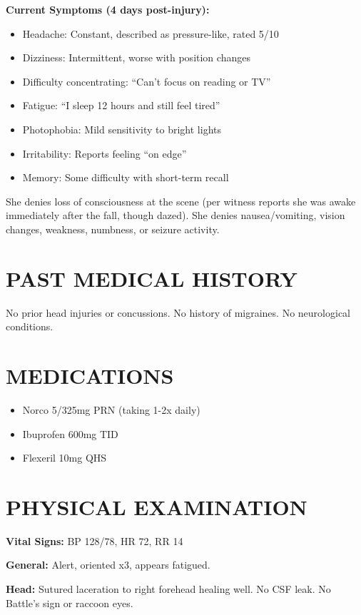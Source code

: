 \documentclass[11pt]{article}
\begin{document}
\textbf{Current Symptoms (4 days post-injury):}
\begin{itemize}[nosep]
\item Headache: Constant, described as pressure-like, rated 5/10
\item Dizziness: Intermittent, worse with position changes
\item Difficulty concentrating: ``Can't focus on reading or TV''
\item Fatigue: ``I sleep 12 hours and still feel tired''
\item Photophobia: Mild sensitivity to bright lights
\item Irritability: Reports feeling ``on edge''
\item Memory: Some difficulty with short-term recall
\end{itemize}

She denies loss of consciousness at the scene (per witness reports she was awake immediately after the fall, though dazed). She denies nausea/vomiting, vision changes, weakness, numbness, or seizure activity.

\section*{PAST MEDICAL HISTORY}

No prior head injuries or concussions. No history of migraines. No neurological conditions.

\section*{MEDICATIONS}

\begin{itemize}[nosep]
\item Norco 5/325mg PRN (taking 1-2x daily)
\item Ibuprofen 600mg TID
\item Flexeril 10mg QHS
\end{itemize}

\section*{PHYSICAL EXAMINATION}

\textbf{Vital Signs:} BP 128/78, HR 72, RR 14

\textbf{General:} Alert, oriented x3, appears fatigued.

\textbf{Head:} Sutured laceration to right forehead healing well. No CSF leak. No Battle's sign or raccoon eyes.
\end{document}
